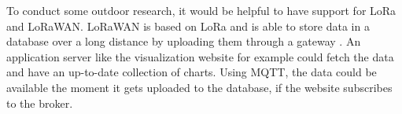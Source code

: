 \documentclass{article}      %
\begin{document}
To conduct some outdoor research, it would be helpful to have support for LoRa and LoRaWAN. LoRaWAN is based on LoRa and is able to store data in a database over a long distance by uploading them through a gateway \cite{lora}. An application server like the visualization website for example could fetch the data and have an up-to-date collection of charts. Using \gls{MQTT}, the data could be available the moment it gets uploaded to the database, if the website subscribes to the broker.




\end{document}
